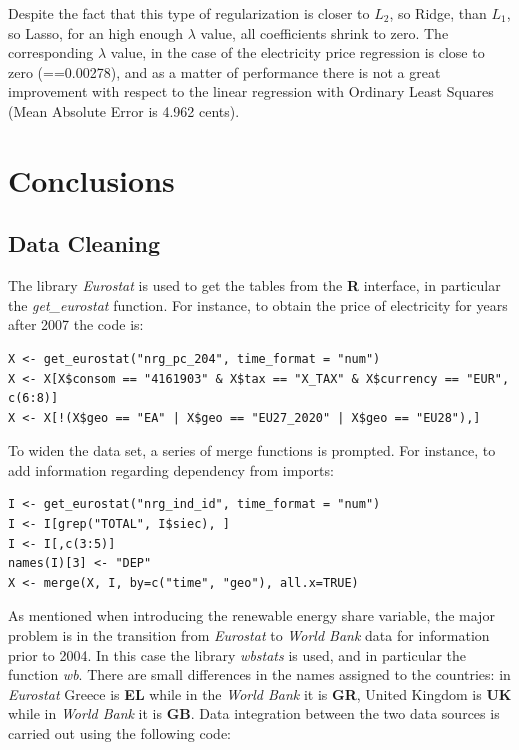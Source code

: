 \documentclass{book}
\begin{document}
Despite the fact that this type of regularization is closer to $L_2$, so Ridge, than $L_1$, so Lasso, for an high enough $\lambda$ value, all coefficients shrink to zero. The corresponding $\lambda$ value, in the case of the electricity price regression is close to zero (==0.00278), and as a matter of performance there is not a great improvement with respect to the linear regression with Ordinary Least Squares (Mean Absolute Error is 4.962 cents).
\chapter{Conclusions}

\begin{appendices}
\chapter*{Data Cleaning}
The library \textit{Eurostat} is used to get the tables from the \textbf{R} interface, in particular the \textit{get\_eurostat} function. For instance, to obtain the price of electricity for years after 2007 the code is:

\begin{verbatim}
X <- get_eurostat("nrg_pc_204", time_format = "num")
X <- X[X$consom == "4161903" & X$tax == "X_TAX" & X$currency == "EUR", c(6:8)]
X <- X[!(X$geo == "EA" | X$geo == "EU27_2020" | X$geo == "EU28"),]
\end{verbatim}

To widen the data set, a series of merge functions is prompted. For instance, to add information regarding dependency from imports:

\begin{verbatim}
I <- get_eurostat("nrg_ind_id", time_format = "num")
I <- I[grep("TOTAL", I$siec), ]
I <- I[,c(3:5)]
names(I)[3] <- "DEP"
X <- merge(X, I, by=c("time", "geo"), all.x=TRUE)
\end{verbatim}

As mentioned when introducing the renewable energy share variable, the major problem is in the transition from \textit{Eurostat} to \textit{World Bank} data for information prior to 2004. In this case the library \textit{wbstats} is used, and in particular the function \textit{wb}. There are small differences in the names assigned to the countries: in \textit{Eurostat} Greece is \textbf{EL} while in the \textit{World Bank} it is \textbf{GR}, United Kingdom is \textbf{UK} while in \textit{World Bank} it is \textbf{GB}. Data integration between the two data sources is carried out using the following code:


\end{appendices}
\end{document}
